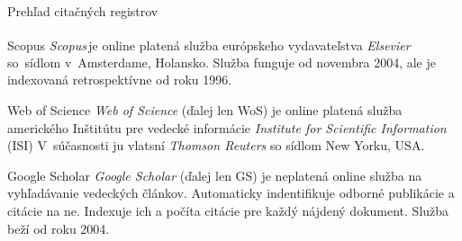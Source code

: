 \documentclass{beamer}
\newcommand{\R}{\textsuperscript{\textregistered}}
\begin{document}
%
%
\begin{frame}{Prehľad citačných registrov}
  \footnotesize

  \begin{block}{Scopus}
    \emph{Scopus}\,\R je online platená služba európskeho vydavateľstva
    \emph{Elsevier} so~sídlom v~Amsterdame, Holansko. Služba funguje od
    novembra 2004, ale je indexovaná retrospektívne od roku 1996. 

  \end{block}


  \begin{block}{Web of Science}
    \emph{Web of Science} (ďalej len WoS) je online platená služba amerického
    Inštitútu pre vedecké informácie \emph{Institute for Scientific
    Information} (ISI)  V~súčasnosti ju vlatsní \emph{Thomson Reuters} 
    so sídlom New Yorku, USA.
  \end{block}


  \begin{block}{Google Scholar}
    \emph{Google Scholar} (ďalej len GS) je neplatená online služba na
    vyhľadávanie vedeckých článkov. Automaticky indentifikuje odborné
    publikácie a citácie na ne. Indexuje ich a počíta citácie pre každý nájdený
    dokument.  Služba beží od roku 2004.
  \end{block}
\end{frame}

%
%

%
%

%
%
\end{document}
